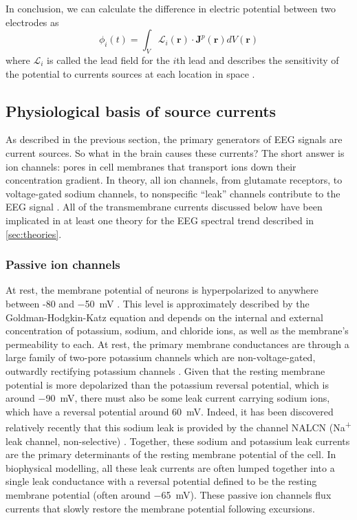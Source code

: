 In conclusion, we can calculate the difference in electric potential between two electrodes as \cite{RevModPhys.65.413}
\begin{equation} \label{eq:lead_solution_J}
    \phi_i(t) = \int_V \mathcal{L}_i(\bm{r}) \cdot \bm{J}^p(\bm{r}) dV(\bm{r})
\end{equation}
where $\mathcal{L}_i$ is called the lead field for the $i$th lead  and describes the sensitivity of the potential to currents sources at each location in space \cite{Malmivuo1995}. 


\subsection{Physiological basis of source currents}
As described in the previous section, the primary generators of EEG signals are current sources. So what in the brain causes these currents? The short answer is ion channels: pores in cell membranes that transport ions down their concentration gradient. In theory, all ion channels, from glutamate receptors, to voltage-gated sodium channels, to nonspecific ``leak'' channels contribute to the EEG signal \cite{Buzsaki2012}. All of the transmembrane currents discussed below have been implicated in at least one theory for the EEG spectral trend described in \autoref{sec:theories}.

\subsubsection{Passive ion channels} \label{sec:I_L}
At rest, the membrane potential of neurons is hyperpolarized to anywhere between -80 and \qty{-50}{\milli\volt} \cite{Ren2011}. This level is approximately described by the Goldman-Hodgkin-Katz equation \cite{Hodgkin1949} and depends on the internal and external concentration of potassium, sodium, and chloride ions, as well as the membrane's permeability to each. At rest, the primary membrane conductances are through a large family of two-pore potassium channels \cite{Goldstein2005,Ren2011} which are non-voltage-gated, outwardly rectifying potassium channels \cite{Goldstein2001}. Given that the resting membrane potential is more depolarized than the potassium reversal potential, which is around \qty{-90}{\milli\volt}, there must also be some leak current carrying sodium ions, which have a reversal potential around  \qty{60}{\milli\volt}. Indeed, it has been discovered relatively recently that this sodium leak is provided by the channel NALCN (Na\textsuperscript{+} leak channel, non-selective) \cite{Ren2011}. Together, these sodium and potassium leak currents are the primary determinants of the resting membrane potential of the cell. In biophysical modelling, all these leak currents are often lumped together into a single leak conductance with a reversal potential defined to be the resting membrane potential (often around \qty{-65}{\milli\volt}). These passive ion channels flux currents that slowly restore the membrane potential following excursions.

